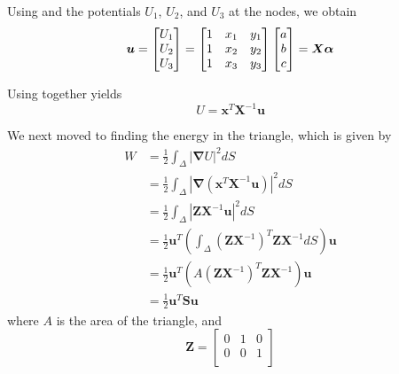 \documentclass[journal,hidelinks]{IEEEtran}
\begin{document}
Using  and the potentials $U_1$, $U_2$, and $U_3$ at the nodes, we obtain
\begin{equation}
\label{eq:potential_system}
\boldsymbol{u} =
\begin{bmatrix}
U_1 \\
U_2 \\
U_3 \\
\end{bmatrix}
=
\begin{bmatrix}
1 & x_1 & y_1 \\
1 & x_2 & y_2 \\
1 & x_3 & y_3 \\
\end{bmatrix}
\begin{bmatrix}
a \\
b \\
c \\
\end{bmatrix}
=
\boldsymbol{X} \boldsymbol{\alpha} \\
\end{equation}

Using  together yields
\begin{equation}
U = \boldsymbol{x}^T \boldsymbol{X}^{-1} \boldsymbol{u}
\end{equation}

We next moved to finding the energy in the triangle, which is given by
\begin{align}
W &= \frac{1}{2} \int_{\Delta} |\boldsymbol{\nabla} U|^2 dS \\
  &= \frac{1}{2} \int_{\Delta} |\boldsymbol{\nabla} (\boldsymbol{x}^T \boldsymbol{X}^{-1} \boldsymbol{u})|^2 dS \\
  &= \frac{1}{2} \int_{\Delta} |\boldsymbol{Z} \boldsymbol{X}^{-1} \boldsymbol{u}|^2 dS \\
  &= \frac{1}{2} \boldsymbol{u}^T (\int_{\Delta} (\boldsymbol{Z} \boldsymbol{X}^{-1})^T \boldsymbol{Z} \boldsymbol{X}^{-1} dS) \boldsymbol{u} \\
  &= \frac{1}{2} \boldsymbol{u}^T (A (\boldsymbol{Z} \boldsymbol{X}^{-1})^T \boldsymbol{Z} \boldsymbol{X}^{-1}) \boldsymbol{u} \\
  &= \frac{1}{2} \boldsymbol{u}^T \boldsymbol{S} \boldsymbol{u}
\end{align}
where $A$ is the area of the triangle, and
\begin{equation}
\boldsymbol{Z} =
\begin{bmatrix}
0 & 1 & 0 \\
0 & 0 & 1 \\
\end{bmatrix}
\end{equation}
\end{document}
